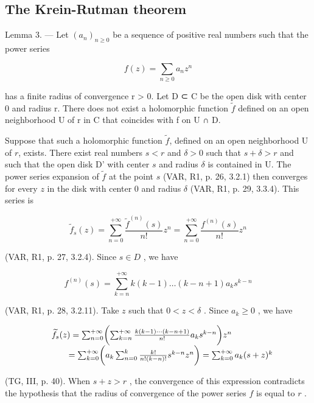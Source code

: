 \subsection{The Krein-Rutman theorem}

Lemma 3. --- Let \((a_n)_{n \geqslant 0}\) be a sequence of positive real numbers such that the power series

\[
f (z) = \sum_ {n \geqslant 0} a _ {n} z ^ {n}
\]

has a finite radius of convergence r \textgreater{} 0. Let D ⊂ C be the open disk with center 0 and radius r. There does not exist a holomorphic function \(\widetilde{f}\) defined on an open neighborhood U of r in C that coincides with f on U ∩ D.

Suppose that such a holomorphic function \(\tilde{f}\), defined on an open neighborhood U of \(r\), exists. There exist real numbers \(s < r\) and \(\delta > 0\) such that \(s + \delta > r\) and such that the open disk D' with center \(s\) and radius \(\delta\) is contained in U. The power series expansion of \(\tilde{f}\) at the point \(s\) (VAR, R1, p. 26, 3.2.1) then converges for every \(z\) in the disk with center 0 and radius \(\delta\) (VAR, R1, p. 29, 3.3.4). This series is

\[
\widetilde {f} _ {s} (z) = \sum_ {n = 0} ^ {+ \infty} \frac {\widetilde {f} ^ {(n)} (s)}{n !} z ^ {n} = \sum_ {n = 0} ^ {+ \infty} \frac {f ^ {(n)} (s)}{n !} z ^ {n}
\]

(VAR, R1, p. 27, 3.2.4). Since \(s \in D\) , we have

\[
f ^ {(n)} (s) = \sum_ {k = n} ^ {+ \infty} k (k - 1) \dots (k - n + 1) a _ {k} s ^ {k - n}
\]

(VAR, R1, p. 28, 3.2.11). Take \(z\) such that \(0 < z < \delta\) . Since \(a_{k} \geqslant 0\) , we have

\[
\begin{array}{r l} & {\widetilde {f} _ {s} (z) = \sum_ {n = 0} ^ {+ \infty} \biggl (\sum_ {k = n} ^ {+ \infty} \frac {k (k - 1) \cdots (k - n + 1)}{n !} a _ {k} s ^ {k - n} \biggr) z ^ {n}} \\ & {\qquad = \sum_ {k = 0} ^ {+ \infty} \biggl (a _ {k} \sum_ {n = 0} ^ {k} \frac {k !}{n ! (k - n) !} s ^ {k - n} z ^ {n} \biggr) = \sum_ {k = 0} ^ {+ \infty} a _ {k} (s + z) ^ {k}} \end{array}
\]

(TG, III, p. 40). When \(s + z > r\) , the convergence of this expression contradicts the hypothesis that the radius of convergence of the power series \(f\) is equal to \(r\) .

